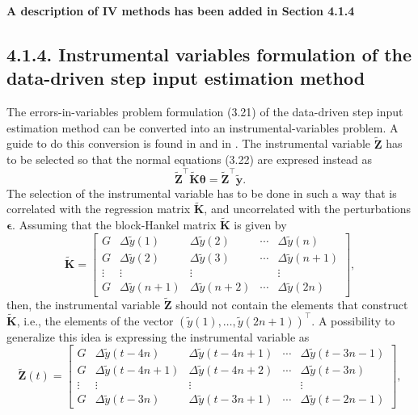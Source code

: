 \documentclass[11pt]{article}
\begin{document}
\begin{itemize}
\begin{itemize}
        {\bfseries A description of IV methods has been added in Section 4.1.4}
        
        \color{blue}
        \subsection*{4.1.4. Instrumental variables formulation of the data-driven step input estimation method}

        The errors-in-variables problem formulation (3.21) of the data-driven step input estimation method can be converted into an instrumental-variables problem.
        A guide to do this conversion is found in \cite{Soderstrom18} and in \cite{Pintelon12Book}. 
        The instrumental variable $\widetilde{\mathbf{Z}}$ has to be selected so that the normal equations (3.22) are expresed instead as
        \begin{equation} \tag{4.23} \widetilde{\mathbf{Z}}^\top \widetilde{\mathbf{K}} \bm{\theta} = \widetilde{\mathbf{Z}}^\top \widetilde{\mathbf{y}} . \label{eqn:neq_siv} \end{equation}
        The selection of the instrumental variable has to be done in such a way that is correlated with the regression matrix $\widetilde{\mathbf{K}}$, and uncorrelated with the perturbations $\bm{\epsilon}$.
        Assuming that the block-Hankel matrix $\widetilde{\mathbf{K}}$ is given by
        \begin{equation} \tag{4.24} \widetilde{\mathbf{K}} = \begin{bmatrix} G & \Delta \widetilde{y}(1) & \Delta \widetilde{y}(2) & \cdots & \Delta \widetilde{y}(n) \\ G & \Delta \widetilde{y}(2) & \Delta \widetilde{y}(3) & \cdots & \Delta \widetilde{y}(n+1) \\ \vdots & \vdots & \vdots & & \vdots \\ G & \Delta \widetilde{y}(n+1) & \Delta \widetilde{y}(n+2) & \cdots & \Delta \widetilde{y}(2n) \end{bmatrix} , \label{eqn:matrixK_r} \end{equation}
        then, the instrumental variable $\widetilde{\mathbf{Z}}$ should not contain the elements that construct $\widetilde{\mathbf{K}}$, i.e., the elements of the vector $\left( \widetilde{y}(1), \ldots, \widetilde{y}(2n+1) \right)^\top$.
        A possibility to generalize this idea is expressing the instrumental variable as
        \begin{equation} \tag{4.25} \widetilde{\mathbf{Z}}(t) = \begin{bmatrix} G & \Delta \widetilde{y}(t-4n) & \Delta \widetilde{y}(t-4n+1) & \cdots & \Delta \widetilde{y}(t-3n-1) \\ G & \Delta \widetilde{y}(t-4n+1) & \Delta \widetilde{y}(t-4n+2) & \cdots & \Delta \widetilde{y}(t-3n) \\ \vdots & \vdots & \vdots & & \vdots \\ G & \Delta \widetilde{y}(t-3n) & \Delta \widetilde{y}(t-3n+1) & \cdots & \Delta \widetilde{y}(t-2n-1) \end{bmatrix} , \label{eqn:matrixZ_t} \end{equation}

\end{itemize}
\end{itemize}
\end{document}
